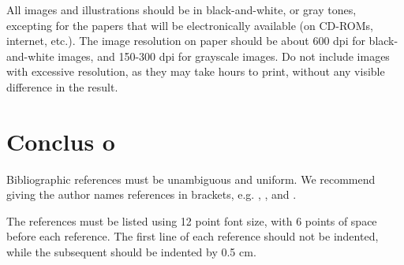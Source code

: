 \documentclass{article}
\begin{document}
All images and illustrations should be in black-and-white, or gray tones,
excepting for the papers that will be electronically available (on CD-ROMs,
internet, etc.). The image resolution on paper should be about 600 dpi for
black-and-white images, and 150-300 dpi for grayscale images.  Do not include
images with excessive resolution, as they may take hours to print, without any
visible difference in the result. 

\section{Conclus o}

Bibliographic references must be unambiguous and uniform.  We recommend giving
the author names references in brackets, e.g. \cite{knuth:84},
\cite{boulic:91}, and \cite{smith:99}.

The references must be listed using 12 point font size, with 6 points of space
before each reference. The first line of each reference should not be
indented, while the subsequent should be indented by 0.5 cm.
\end{document}

